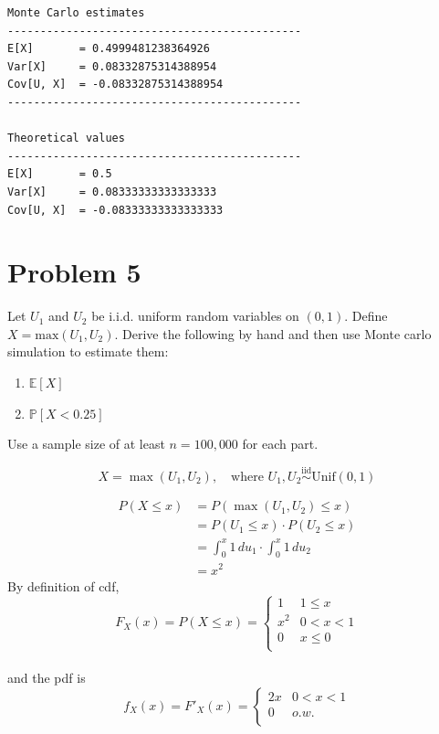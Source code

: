 \documentclass[11pt]{article}
\begin{document}
    \begin{Verbatim}[commandchars=\\\{\}]
Monte Carlo estimates
---------------------------------------------
E[X]       = 0.4999481238364926
Var[X]     = 0.08332875314388954
Cov[U, X]  = -0.08332875314388954
---------------------------------------------

Theoretical values
---------------------------------------------
E[X]       = 0.5
Var[X]     = 0.08333333333333333
Cov[U, X]  = -0.08333333333333333
    \end{Verbatim}

    \hypertarget{problem-5}{%
\section{Problem 5}\label{problem-5}}

Let \(U_1\) and \(U_2\) be i.i.d. uniform random variables on
\((0, 1)\). Define \(X = \textrm{max}(U_1, U_2)\). Derive the following
by hand and then use Monte carlo simulation to estimate them:

\begin{enumerate}
\def\labelenumi{\arabic{enumi})}
\item
  \(\mathbb{E}[X]\)
\item
  \(\mathbb{P}[X < 0.25]\)
\end{enumerate}

Use a sample size of at least \(n = 100,000\) for each part.

    \[X = \max(U_{1},U_{2}), \quad \text{where } U_{1},U_{2} \overset{\text{iid}}{\sim} \text{Unif}\left( 0,1\right)\]

    \begin{align*}
    P(X \leq x) &= P(\max \left( U_{1},U_{2}\right) \leq x)  \\ 
    &= P(U_{1} \leq x) \cdot P\left( U_{2}\leq x\right)  \\ 
    &= \int _{0}^{x}1\,du_1 \cdot \int _{0}^{x}1\,du_{2} \\ 
    &= x^2 
\end{align*} By definition of cdf, \[F_X(x) = P(X \leq x) = 
\begin{cases}
    1 & 1 \leq x \\
    x^2 & 0 < x < 1 \\ 
    0 & x \leq 0 \\
\end{cases}\]\\
and the pdf is \[f_X(x) = F'_X(x) = 
\begin{cases}
    2x & 0 < x < 1 \\
    0 & o.w. \\
\end{cases}\]
\end{document}
